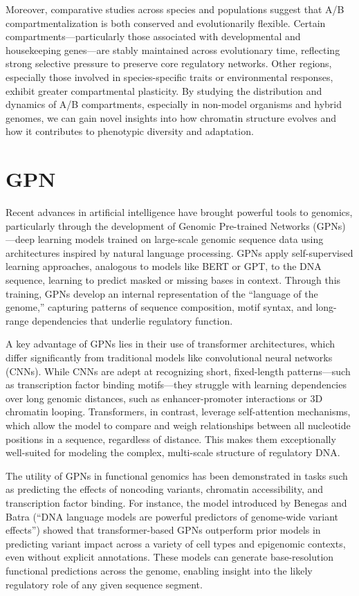 \documentclass[
  a4paper,
  openany]{scrbook}
\begin{document}
Moreover, comparative studies across species and populations suggest
that A/B compartmentalization is both conserved and evolutionarily
flexible. Certain compartments---particularly those associated with
developmental and housekeeping genes---are stably maintained across
evolutionary time, reflecting strong selective pressure to preserve core
regulatory networks. Other regions, especially those involved in
species-specific traits or environmental responses, exhibit greater
compartmental plasticity. By studying the distribution and dynamics of
A/B compartments, especially in non-model organisms and hybrid genomes,
we can gain novel insights into how chromatin structure evolves and how
it contributes to phenotypic diversity and adaptation.

\section{GPN}\label{gpn}

Recent advances in artificial intelligence have brought powerful tools
to genomics, particularly through the development of Genomic Pre-trained
Networks (GPNs)---deep learning models trained on large-scale genomic
sequence data using architectures inspired by natural language
processing. GPNs apply self-supervised learning approaches, analogous to
models like BERT or GPT, to the DNA sequence, learning to predict masked
or missing bases in context. Through this training, GPNs develop an
internal representation of the ``language of the genome,'' capturing
patterns of sequence composition, motif syntax, and long-range
dependencies that underlie regulatory function.

A key advantage of GPNs lies in their use of transformer architectures,
which differ significantly from traditional models like convolutional
neural networks (CNNs). While CNNs are adept at recognizing short,
fixed-length patterns---such as transcription factor binding
motifs---they struggle with learning dependencies over long genomic
distances, such as enhancer-promoter interactions or 3D chromatin
looping. Transformers, in contrast, leverage self-attention mechanisms,
which allow the model to compare and weigh relationships between all
nucleotide positions in a sequence, regardless of distance. This makes
them exceptionally well-suited for modeling the complex, multi-scale
structure of regulatory DNA.

The utility of GPNs in functional genomics has been demonstrated in
tasks such as predicting the effects of noncoding variants, chromatin
accessibility, and transcription factor binding. For instance, the model
introduced by Benegas and Batra (``DNA language models are powerful
predictors of genome-wide variant effects'') showed that
transformer-based GPNs outperform prior models in predicting variant
impact across a variety of cell types and epigenomic contexts, even
without explicit annotations. These models can generate base-resolution
functional predictions across the genome, enabling insight into the
likely regulatory role of any given sequence segment.
\end{document}
